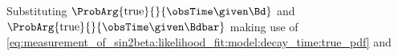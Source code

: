 %
%
Substituting $\ProbArg{\text{true}}{}{\obsTime \given \Bd}$ and
$\ProbArg{\text{true}}{}{\obsTime \given \Bdbar}$ making use of
\cref{eq:measurement_of_sin2beta:likelihood_fit:model:decay_time:true_pdf} and
